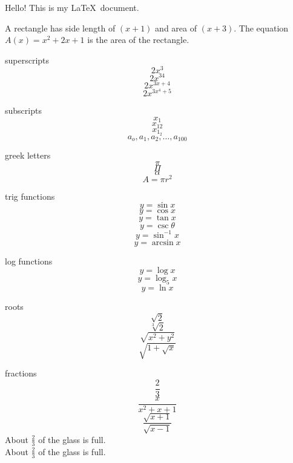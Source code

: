 \documentclass[11pt]{article}
\begin{document}
 
Hello! This is my \LaTeX\ document.

A rectangle has side length of $(x+1)$ and area of $(x+3)$. The equation $A(x)=x^2+2x+1$ is the area of the rectangle.

superscripts $$2x^3$$
$$2x^{34}$$
$$2x^{3x+4}$$
$$2x^{3x^4+5}$$

subscripts $$x_1$$
$$x_{12}$$
$$x_{1_2}$$
$$a_o,a_1,a_2,\ldots,a_{100}$$

greek letters $$\pi$$
$$\Pi$$
$$\alpha$$
$$A=\pi r^2$$

trig functions $$y=\sin x$$
$$y=\cos x$$
$$y=\tan x$$
$$y=\csc \theta$$
$$y=\sin^{-1} x$$
$$y=\arcsin x$$

log functions $$y=\log x$$
$$y=\log_5 x$$
$$y=\ln x$$

roots $$\sqrt{2}$$
$$\sqrt[3]{2}$$
$$\sqrt{x^2+y^2}$$
$$\sqrt{1+\sqrt{x}}$$

fractions $$\frac{2}{3}$$
$$\frac{x}{x^2+x+1}$$
$$\frac{\sqrt{x+1}}{\sqrt{x-1}}$$
About $\displaystyle \frac{2}{3}$ of the glass is full.\\[16pt]
About $\displaystyle \frac{2}{3}$ of the glass is full.
\end{document}
